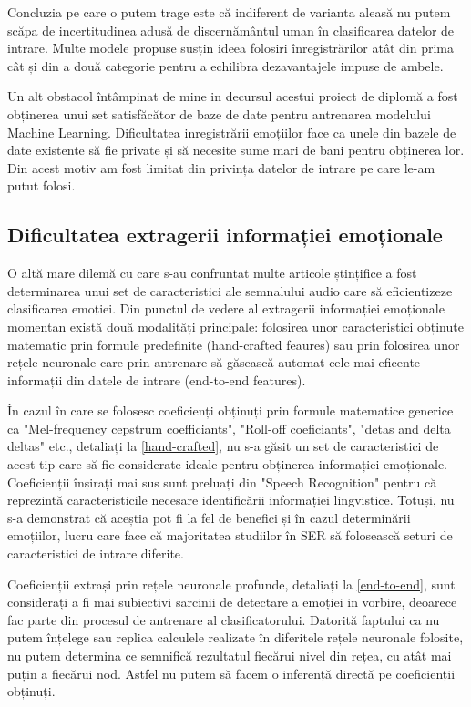 \documentclass[a4paper,12pt]{book}
\begin{document}
					Concluzia pe care o putem trage este că indiferent de varianta aleasă nu putem scăpa de incertitudinea adusă de discernământul uman în clasificarea datelor de intrare. Multe modele propuse susțin ideea folosiri înregistrărilor atât din prima cât și din a două categorie pentru a echilibra dezavantajele impuse de ambele. \par
					Un alt obstacol întâmpinat de mine in decursul acestui proiect de diplomă a fost obținerea unui set satisfăcător de baze de date pentru antrenarea modelului Machine Learning. Dificultatea inregistrării emoțiilor face ca unele din bazele de date existente să fie private și să necesite sume mari de bani pentru obținerea lor. Din acest motiv am fost limitat din privința datelor de intrare pe care le-am putut folosi.
				
				\subsection{Dificultatea extragerii informației emoționale} \label{dif_fex}
					O altă mare dilemă cu care s-au confruntat multe articole ștințifice a fost determinarea unui set de caracteristici ale semnalului audio care să eficientizeze clasificarea emoției. Din punctul de vedere al extragerii informației emoționale momentan există două modalități principale: folosirea unor caracteristici obținute matematic prin formule predefinite (hand-crafted feaures) sau prin folosirea unor rețele neuronale care prin antrenare să găsească automat cele mai eficente informații din datele de intrare (end-to-end features). \par
					În cazul în care se folosesc coeficienți obținuți prin formule matematice generice ca "Mel-frequency cepstrum coefficiants", "Roll-off coeficiants", "detas and delta deltas" etc., detaliați la \ref{hand-crafted}, nu s-a găsit un set de caracteristici de acest tip care să fie considerate ideale pentru obținerea informației emoționale. Coeficienții înșirați mai sus sunt preluați din "Speech Recognition" pentru că reprezintă caracteristicile necesare identificării informației lingvistice. Totuși, nu s-a demonstrat că aceștia pot fi la fel de benefici și în cazul determinării emoțiilor, lucru care face că majoritatea studiilor în SER să folosească seturi de caracteristici de intrare diferite. \par
					Coeficienții extrași prin rețele neuronale profunde, detaliați la \ref{end-to-end}, sunt considerați a fi mai subiectivi sarcinii de detectare a emoției in vorbire, deoarece fac parte din procesul de antrenare al clasificatorului. Datorită faptului ca nu putem înțelege sau replica calculele realizate în diferitele rețele neuronale folosite, nu putem determina ce semnifică rezultatul fiecărui nivel din rețea, cu atât mai puțin a fiecărui nod. Astfel nu putem să facem o inferență directă pe coeficienții obținuți. \par
					
\end{document}
